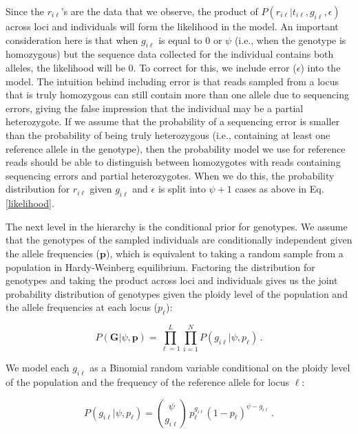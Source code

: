 \documentclass[11pt,english,letterpaper,oneside]{article}
\begin{document}
\noindent Since the $r_{i \ell}$'s are the data that we observe, the product of $P(r_{i \ell}|t_{i\ell}, g_{i \ell},\epsilon)$ across loci and individuals will form the likelihood in the model. An important consideration here is that when $g_{i \ell}$ is equal to 0 or $\psi$ (i.e., when the genotype is homozygous) but the sequence data collected for the individual contains both alleles, the likelihood will be 0. To correct for this, we include error ($\epsilon$) into the model. The intuition behind including error is that reads sampled from a locus that is truly homozygous can still contain more than one allele due to sequencing errors, giving the false impression that the individual may be a partial heterozygote. If we assume that the probability of a sequencing error is smaller than the probability of being truly heterozygous (i.e., containing at least one reference allele in the genotype), then the probability model we use for reference reads should be able to distinguish between homozygotes with reads containing sequencing errors and partial heterozygotes. When we do this, the probability distribution for $r_{i\ell}$ given $g_{i\ell}$ and $\epsilon$ is split into $\psi+1$ cases as above in Eq. \ref{likelihood}.
\medskip

The next level in the hierarchy is the conditional prior for genotypes. We assume that the genotypes of the sampled individuals are conditionally independent given the allele frequencies ($\bm{p}$), which is equivalent to taking a random sample from a population in Hardy-Weinberg equilibrium. Factoring the distribution for genotypes and taking the product across loci and individuals gives us the joint probability distribution of genotypes given the ploidy level of the population and the allele frequencies at each locus ($p_{\ell}$):

\begin{equation}\label{condl_prior}
P(\bm{G}|\psi, \bm{p}) = \displaystyle\prod_{\ell=1}^L\displaystyle\prod_{i=1}^N P(g_{i \ell}|\psi, p_{\ell})\,.
\end{equation}

\noindent We model each $g_{i \ell}$ as a Binomial random variable conditional on the ploidy level of the population and the frequency of the reference allele for locus $\ell$:

\begin{equation*}
P(g_{i \ell}|\psi,p_{\ell}) = \binom{\psi}{g_{i \ell}}\,p_{\ell}^{g_{i \ell}}(1-p_{\ell})^{\psi-g_{i \ell}}\,.
\end{equation*}
\end{document}
